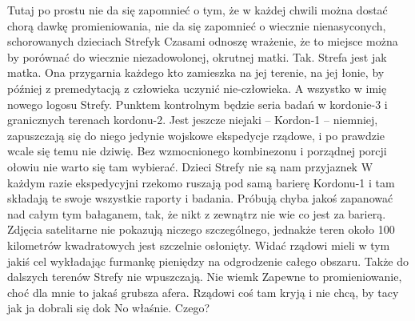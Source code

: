 \documentclass[../MAIN.tex]{subfiles}
\begin{document}
Tutaj po prostu nie da się zapomnieć o tym, że w każdej chwili można dostać chorą dawkę promieniowania, nie da się zapomnieć o wiecznie nienasyconych, schorowanych dzieciach Strefy\3k Czasami odnoszę wrażenie, że to miejsce można by porównać do wiecznie niezadowolonej, okrutnej matki. Tak. Strefa jest jak matka. Ona przygarnia każdego kto zamieszka na jej terenie, na jej łonie, by później z premedytacją z człowieka uczynić nie-człowieka. A wszystko w imię nowego logosu Strefy.
% 
% 
Punktem kontrolnym będzie seria badań w kordonie-3 i granicznych terenach kordonu-2. Jest jeszcze niejaki -- Kordon-1 -- niemniej, zapuszczają się do niego jedynie wojskowe ekspedycje rządowe, i po prawdzie wcale się temu nie dziwię. Bez wzmocnionego kombinezonu i porządnej porcji ołowiu nie warto się tam wybierać. Dzieci Strefy nie są nam przyjazne\3k W każdym razie ekspedycyjni rzekomo ruszają pod samą barierę Kordonu-1 i tam składają te swoje wszystkie raporty i badania. Próbują chyba jakoś zapanować nad całym tym bałaganem, tak, że nikt z zewnątrz nie wie co jest za barierą. Zdjęcia satelitarne nie pokazują niczego szczególnego, jednakże teren około 100 kilometrów kwadratowych jest szczelnie osłonięty. Widać rządowi mieli w tym jakiś cel wykładając furmankę pieniędzy na odgrodzenie całego obszaru. Także do dalszych terenów Strefy nie wpuszczają. Nie wiem\3k Zapewne to promieniowanie, choć dla mnie to jakaś grubsza afera. Rządowi coś tam kryją i nie chcą, by tacy jak ja dobrali się do\3k No właśnie. Czego?
 
\end{document}
